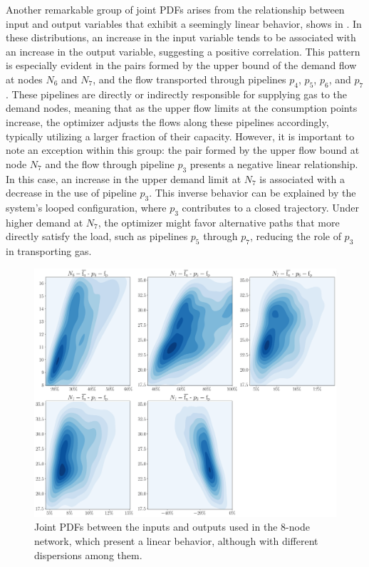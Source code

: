 Another remarkable group of joint PDFs arises from the relationship between input and output variables that exhibit a seemingly linear behavior, shows in . In these distributions, an increase in the input variable tends to be associated with an increase in the output variable, suggesting a positive correlation. This pattern is especially evident in the pairs formed by the upper bound of the demand flow at nodes $N_6$ and $N_7$, and the flow transported through pipelines $p_4$, $p_5$, $p_6$, and $p_7$. These pipelines are directly or indirectly responsible for supplying gas to the demand nodes, meaning that as the upper flow limits at the consumption points increase, the optimizer adjusts the flows along these pipelines accordingly, typically utilizing a larger fraction of their capacity. However, it is important to note an exception within this group: the pair formed by the upper flow bound at node $N_7$ and the flow through pipeline $p_3$ presents a negative linear relationship. In this case, an increase in the upper demand limit at $N_7$ is associated with a decrease in the use of pipeline $p_3$. This inverse behavior can be explained by the system's looped configuration, where $p_3$ contributes to a closed trajectory. Under higher demand at $N_7$, the optimizer might favor alternative paths that more directly satisfy the load, such as pipelines $p_5$ through $p_7$, reducing the role of $p_3$ in transporting gas.


\begin{figure}[H]
    \begin{center}
        \includegraphics[width=.7\textwidth]{figures/Chapter_NonLinealCensnet/inputs_outputs_2.png}
    \end{center}
    \caption{Joint PDFs between the inputs and outputs used in the 8-node network, which present a linear behavior, although with different dispersions among them. }\label{fig:joint_distributions_inputs_outputs_2}
\end{figure}
 


